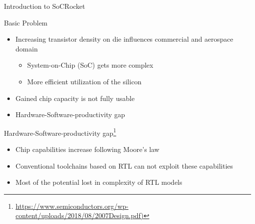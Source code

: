 \begin{frame}{Introduction to SoCRocket}
\begin{block}{Basic Problem}
  \begin{itemize}
		\item Increasing transistor density on die influences commercial and aerospace domain 
			\begin{itemize}
				\item System-on-Chip (SoC) gets more complex
				\item More efficient utilization of the silicon
			\end{itemize}
			\item Gained chip capacity is not fully usable
			\item Hardware-Software-productivity gap	
	\end{itemize}
\end{block}
\end{frame}

\begin{frame}{Hardware-Software-productivity gap\footnote{\url{https://www.semiconductors.org/wp-content/uploads/2018/08/2007Design.pdf)}}}
    \begin{itemize}
     \item Chip capabilities increase following Moore's law
     \item Conventional toolchains based on RTL can not exploit these capabilities
     \item Most of the potential lost in complexity of RTL models
    \end{itemize}

\end{frame}



